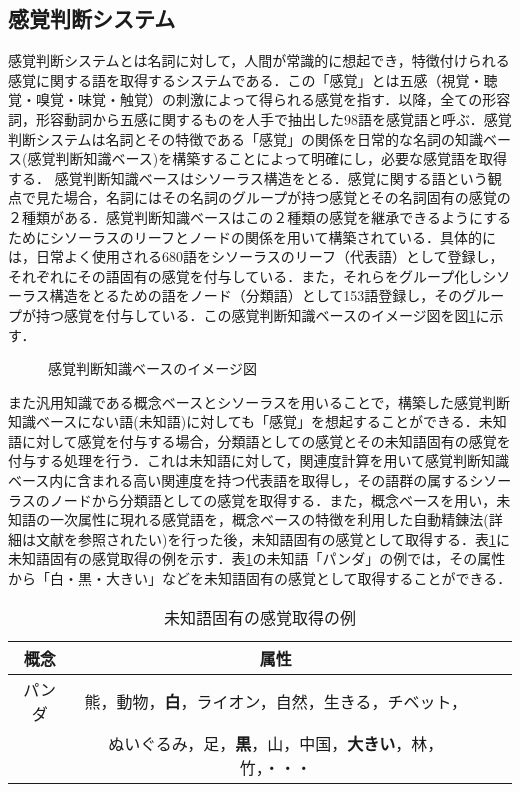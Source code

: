 \subsection{感覚判断システム}
感覚判断システムとは名詞に対して，人間が常識的に想起でき，特徴付けられる感覚に関する語を取得するシステムである\cite{watabe2004}．この「感覚」とは五感（視覚・聴覚・嗅覚・味覚・触覚）の刺激によって得られる感覚を指す．以降，全ての形容詞，形容動詞から五感に関するものを人手で抽出した98語を感覚語と呼ぶ．感覚判断システムは名詞とその特徴である「感覚」の関係を日常的な名詞の知識ベース(感覚判断知識ベース)を構築することによって明確にし，必要な感覚語を取得する．
感覚判断知識ベースはシソーラス構造をとる．感覚に関する語という観点で見た場合，名詞にはその名詞のグループが持つ感覚とその名詞固有の感覚の２種類がある．感覚判断知識ベースはこの２種類の感覚を継承できるようにするためにシソーラスのリーフとノードの関係を用いて構築されている．具体的には，日常よく使用される680語をシソーラスのリーフ（代表語）として登録し，それぞれにその語固有の感覚を付与している．また，それらをグループ化しシソーラス構造をとるための語をノード（分類語）として153語登録し，そのグループが持つ感覚を付与している．この感覚判断知識ベースのイメージ図を図\ref{fig:kankakuDB}に示す．
\begin{figure}[htbp]
	\begin{center}
	  	\epsfxsize=8cm
		\caption{感覚判断知識ベースのイメージ図}
		\label{fig:kankakuDB}
	\end{center}
\end{figure}

また汎用知識である概念ベースとシソーラスを用いることで，構築した感覚判断知識ベースにない語(未知語)に対しても「感覚」を想起することができる．未知語に対して感覚を付与する場合，分類語としての感覚とその未知語固有の感覚を付与する処理を行う．これは未知語に対して，関連度計算を用いて感覚判断知識ベース内に含まれる高い関連度を持つ代表語を取得し，その語群の属するシソーラスのノードから分類語としての感覚を取得する．また，概念ベースを用い，未知語の一次属性に現れる感覚語を，概念ベースの特徴を利用した自動精錬法(詳細は文献\cite{watabe2004}を参照されたい)を行った後，未知語固有の感覚として取得する．表\ref{tb:koyukankakuExam}に未知語固有の感覚取得の例を示す．表\ref{tb:koyukankakuExam}の未知語「パンダ」の例では，その属性から「白・黒・大きい」などを未知語固有の感覚として取得することができる．
\begin{table}[htbp]
    \begin{center}
      \caption{未知語固有の感覚取得の例}
      \label{tb:koyukankakuExam}
      \begin{tabular}{c|clc}
        \hline
        概念 	& 属性\\        \hline
        パンダ 		& 熊，動物，{\bf 白}，ライオン，自然，生きる，チベット，\\
        & ぬいぐるみ，足，{\bf 黒}，山，中国，{\bf 大きい}，林，竹，・・・ \\
        \hline
      \end{tabular}
    \end{center}
\end{table}

